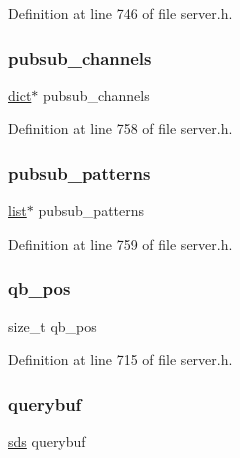 Definition at line 746 of file server.\+h.

\mbox{\label{structclient_ac6c18a3bf3ec4d85777ca2db7d4a9b47}} 
\subsubsection{\texorpdfstring{pubsub\+\_\+channels}{pubsub\_channels}}
{\footnotesize\ttfamily \hyperlink{structdict}{dict}$\ast$ pubsub\+\_\+channels}



Definition at line 758 of file server.\+h.

\mbox{\label{structclient_aced844471ea20e757a4bc7bdee34d930}} 
\subsubsection{\texorpdfstring{pubsub\+\_\+patterns}{pubsub\_patterns}}
{\footnotesize\ttfamily \hyperlink{structlist}{list}$\ast$ pubsub\+\_\+patterns}



Definition at line 759 of file server.\+h.

\mbox{\label{structclient_a2de8996d6723315d26c64886145d5e51}} 
\subsubsection{\texorpdfstring{qb\+\_\+pos}{qb\_pos}}
{\footnotesize\ttfamily size\+\_\+t qb\+\_\+pos}



Definition at line 715 of file server.\+h.

\mbox{\label{structclient_accf8e4a2bc6b80403d3f0f024eaa8a1b}} 
\subsubsection{\texorpdfstring{querybuf}{querybuf}}
{\footnotesize\ttfamily \hyperlink{sds_8h_ad69abac3df4532879db9642c95f5ef6f}{sds} querybuf}



